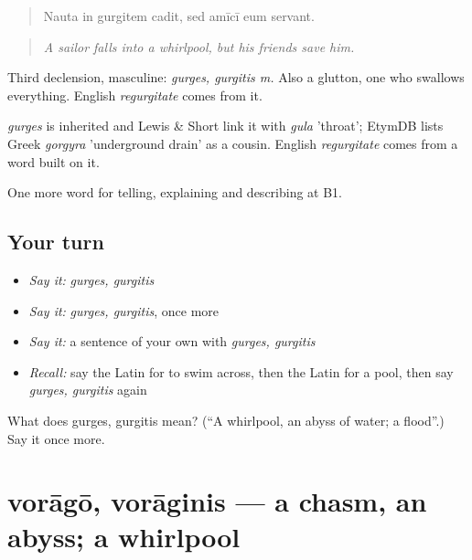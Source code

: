 \begin{quote}
Nauta in gurgitem cadit, sed amīcī eum servant.
\end{quote}

\begin{quote}
\emph{A sailor falls into a whirlpool, but his friends save him.}
\end{quote}

Third declension, masculine: \emph{gurges, gurgitis m.} Also a glutton, one who swallows everything. English \emph{regurgitate} comes from it.

\begin{cousinweb}
\emph{gurges} is inherited and Lewis \& Short link it with \emph{gula} 'throat'; EtymDB lists Greek \emph{gorgyra} 'underground drain' as a cousin. English \emph{regurgitate} comes from a word built on it.
\end{cousinweb}

\begin{grammarlens}[title={What you've built}]
One more word for telling, explaining and describing at B1.
\end{grammarlens}

\subsection*{Your turn}
\begin{itemize}
\raggedright
  \item \emph{Say it:} \emph{gurges, gurgitis}
  \item \emph{Say it:} \emph{gurges, gurgitis}, once more
  \item \emph{Say it:} a sentence of your own with \emph{gurges, gurgitis}
  \item \emph{Recall:} say the Latin for to swim across, then the Latin for a pool, then say \emph{gurges, gurgitis} again
\end{itemize}

\begin{tcolorbox}[breakable,colback=teal!4,colframe=teal!35!black,title={Before you move on}]
What does gurges, gurgitis mean? (\textquotedblleft{}A whirlpool, an abyss of water; a flood\textquotedblright{}.) Say it once more.
\end{tcolorbox}
\section[vorāgō, vorāginis]{vorāgō, vorāginis — a chasm, an abyss; a whirlpool}

